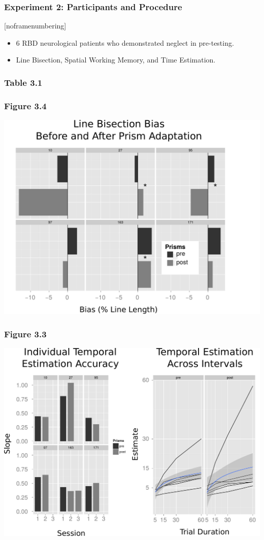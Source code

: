\documentclass{beamer}
\begin{document}
\begin{frame}
	\frametitle{Experiment 2: Participants and Procedure}[noframenumbering]
\begin{itemize}
	\item 6 RBD neurological patients who demonstrated neglect in pre-testing.
	\item Line Bisection, Spatial Working Memory, and Time Estimation.
\end{itemize}
\end{frame}

\begin{frame}[noframenumbering]
	\frametitle{Table 3.1}
	\tiny
	\centering
	\setlength{\tabcolsep}{5pt}
	
\end{frame}


\end{document}
